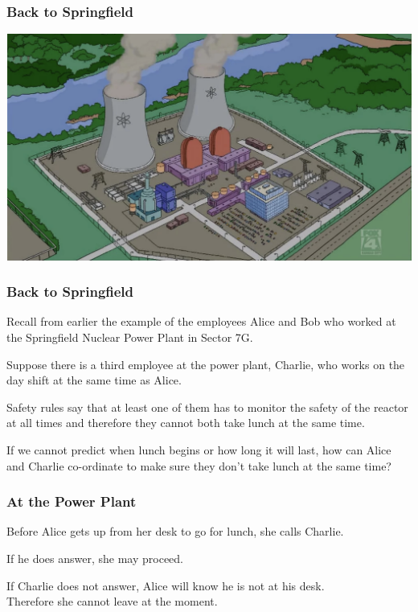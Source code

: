 \begin{frame}
	\frametitle{Back to Springfield}

	\begin{center}
		\includegraphics[width=\textwidth]{images/springfield-plant.png}
	\end{center}


\end{frame}


\begin{frame}
	\frametitle{Back to Springfield}
	Recall from earlier the example of the employees Alice and Bob who worked at the Springfield Nuclear Power Plant in Sector 7G.

	Suppose there is a third employee at the power plant, Charlie, who works on the day shift at the same time as Alice.

	Safety rules say that at least one of them has to monitor the safety of the reactor at all times and therefore they cannot both take lunch at the same time.

	If we cannot predict when lunch begins or how long it will last, how can Alice and Charlie co-ordinate to make sure they don't take lunch at the same time?

\end{frame}

\begin{frame}
	\frametitle{At the Power Plant}

	Before Alice gets up from her desk to go for lunch, she calls Charlie.

	If he does answer, she may proceed.

	If Charlie does not answer, Alice will know he is not at his desk.\\
	\quad Therefore she cannot leave at the moment.

\end{frame}

